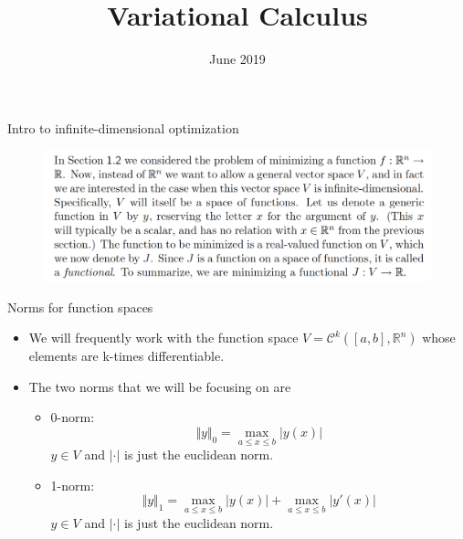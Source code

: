 \documentclass{beamer}
\title{Variational Calculus}
\author{}
\date{June 2019}
\begin{document}
\maketitle

\begin{frame}{Intro to infinite-dimensional optimization}
    \begin{figure}
        \centering
        \includegraphics[width=\linewidth]{ch1/fig1.png}
    \end{figure}
\end{frame}

\begin{frame}{Norms for function spaces}
    \begin{itemize}
        \item We will frequently work with the function space $V = \mathcal{C}^k([a,b], \mathbb{R}^n)$ whose elements are k-times differentiable.
        \item The two norms that we will be focusing on are
        \begin{itemize}
            \item 0-norm: 
            \begin{equation}
                \Vert y \Vert_0 = \max_{a \leq x \leq b} \vert y(x) \vert
            \end{equation}
            $y \in V$ and $\vert \cdot \vert$ is just the euclidean norm.
            \item 1-norm: 
            \begin{equation}
                \Vert y \Vert_1 = \max_{a \leq x \leq b} \vert y(x) \vert + \max_{a \leq x \leq b} \vert y'(x) \vert 
            \end{equation}
            $y \in V$ and $\vert \cdot \vert$ is just the euclidean norm.
        \end{itemize}
    \end{itemize}
\end{frame}
\end{document}
